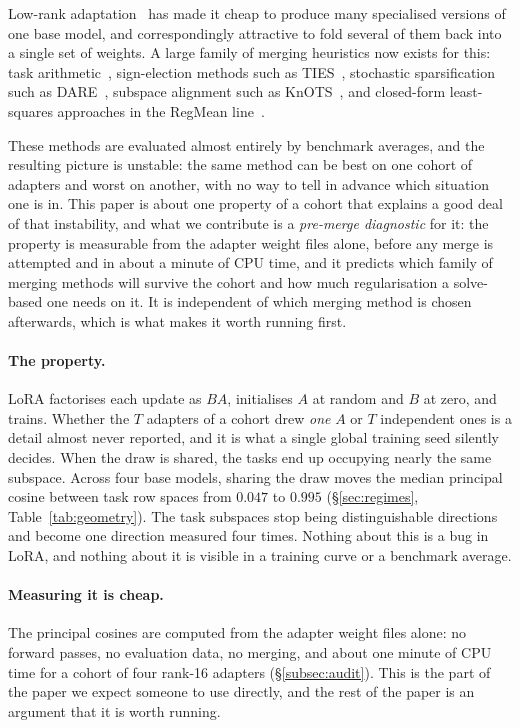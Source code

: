 Low-rank adaptation~\citep{hu2022lora} has made it cheap to produce many
specialised versions of one base model, and correspondingly attractive to
fold several of them back into a single set of weights. A large family of
merging heuristics now exists for this: task
arithmetic~\citep{ilharco2023task}, sign-election methods such as
TIES~\citep{yadav2023ties}, stochastic sparsification such as
DARE~\citep{yu2024dare}, subspace alignment such as
KnOTS~\citep{stoica2025knots}, and closed-form least-squares approaches in
the RegMean line~\citep{jin2023regmean,lorm2024,regmeanpp2025}.

These methods are evaluated almost entirely by benchmark averages, and the
resulting picture is unstable: the same method can be best on one cohort of
adapters and worst on another, with no way to tell in advance which
situation one is in. This paper is about one property of a cohort that
explains a good deal of that instability, and what we contribute is a
\emph{pre-merge diagnostic} for it: the property is measurable from the
adapter weight files alone, before any merge is attempted and in about a
minute of CPU time, and it predicts which family of merging methods will
survive the cohort and how much regularisation a solve-based one needs on
it. It is independent of which merging method is chosen afterwards, which is
what makes it worth running first.

\paragraph{The property.} LoRA factorises each update as $BA$, initialises
$A$ at random and $B$ at zero, and trains. Whether the $T$ adapters of a
cohort drew \emph{one} $A$ or $T$ independent ones is a detail almost never
reported, and it is what a single global training seed silently decides.
When the draw is shared, the tasks end up occupying nearly the same
subspace. Across four base models, sharing the draw moves the median
principal cosine between task row spaces from $0.047$ to $0.995$
(\S\ref{sec:regimes}, Table~\ref{tab:geometry}). The task subspaces stop
being distinguishable directions and become one direction measured four
times. Nothing about this is a bug in LoRA, and nothing about it is visible
in a training curve or a benchmark average.

\paragraph{Measuring it is cheap.} The principal cosines are computed from
the adapter weight files alone: no forward passes, no evaluation data, no
merging, and about one minute of CPU time for a cohort of four rank-16
adapters (\S\ref{subsec:audit}). This is the part of the paper we expect
someone to use directly, and the rest of the paper is an argument that it
is worth running.

